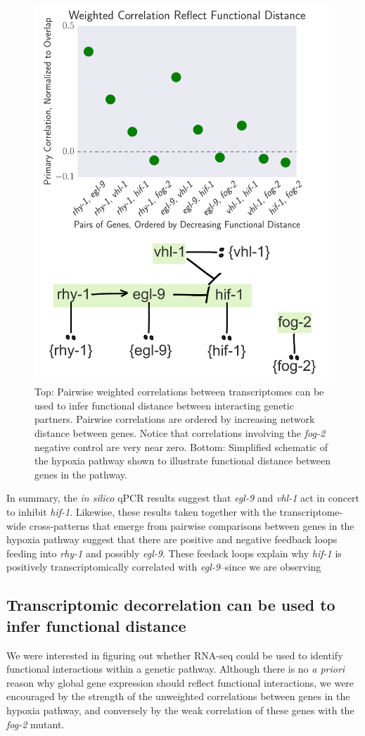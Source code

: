 \documentclass[9pt,twocolumn,twoside]{pnas-new}
\newcommand{\egl}{\emph{egl-9}}
\newcommand{\rhy}{\emph{rhy-1}}
\newcommand{\vhl}{\emph{vhl-1}}
\newcommand{\hif}{\emph{hif-1}}
\newcommand{\fog}{\emph{fog-2}}
\begin{document}
\begin{figure}[tbhp]
\centering
\includegraphics[width=.72\linewidth]{figs/functional_distance.pdf}
\caption{Top: Pairwise weighted correlations between transcriptomes can be used to infer functional distance between interacting genetic partners. Pairwise correlations are ordered by increasing network distance between genes. Notice that correlations involving the \fog{} negative control are very near zero. Bottom: Simplified schematic of the hypoxia pathway shown to illustrate functional distance between genes in the pathway.}
\label{fig:decorrelation}
\end{figure}
In summary, the \emph{in silico} qPCR results suggest that \egl{} and \vhl{} act in concert to inhibit \hif{}. Likewise, these results taken together with the transcriptome-wide cross-patterns that emerge from pairwise comparisons between genes in the hypoxia pathway suggest that there are positive and negative feedback loops feeding into \rhy{} and possibly \egl{}. These feedack loops explain why \hif{} is positively transcriptomically correlated with \egl{}--since we are observing

\subsection{Transcriptomic decorrelation can be used to infer functional distance}
\label{sub:decorrelation}
We were interested in figuring out whether RNA-seq could be used to identify functional interactions within a genetic pathway. Although there is no \emph{a priori} reason why global gene expression should reflect functional interactions, we were encouraged by the strength of the unweighted correlations between genes in the hypoxia pathway, and conversely by the weak correlation of these genes with the \fog{} mutant.
\end{document}
